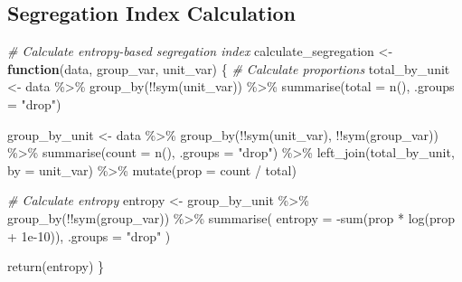 \documentclass[
]{article}
\newenvironment{Shaded}{\begin{snugshade}}{\end{snugshade}}
\newcommand{\AttributeTok}[1]{\textcolor[rgb]{0.77,0.63,0.00}{#1}}
\newcommand{\CommentTok}[1]{\textcolor[rgb]{0.56,0.35,0.01}{\textit{#1}}}
\newcommand{\ControlFlowTok}[1]{\textcolor[rgb]{0.13,0.29,0.53}{\textbf{#1}}}
\newcommand{\FloatTok}[1]{\textcolor[rgb]{0.00,0.00,0.81}{#1}}
\newcommand{\FunctionTok}[1]{\textcolor[rgb]{0.00,0.00,0.00}{#1}}
\newcommand{\NormalTok}[1]{#1}
\newcommand{\OtherTok}[1]{\textcolor[rgb]{0.56,0.35,0.01}{#1}}
\newcommand{\SpecialCharTok}[1]{\textcolor[rgb]{0.00,0.00,0.00}{#1}}
\newcommand{\StringTok}[1]{\textcolor[rgb]{0.31,0.60,0.02}{#1}}
\begin{document}
\hypertarget{segregation-index-calculation}{%
\subsection{Segregation Index
Calculation}\label{segregation-index-calculation}}

\begin{Shaded}
\begin{Highlighting}[]
\CommentTok{\# Calculate entropy{-}based segregation index}
\NormalTok{calculate\_segregation }\OtherTok{\textless{}{-}} \ControlFlowTok{function}\NormalTok{(data, group\_var, unit\_var) \{}
  \CommentTok{\# Calculate proportions}
\NormalTok{  total\_by\_unit }\OtherTok{\textless{}{-}}\NormalTok{ data }\SpecialCharTok{\%\textgreater{}\%}
    \FunctionTok{group\_by}\NormalTok{(}\SpecialCharTok{!!}\FunctionTok{sym}\NormalTok{(unit\_var)) }\SpecialCharTok{\%\textgreater{}\%}
    \FunctionTok{summarise}\NormalTok{(}\AttributeTok{total =} \FunctionTok{n}\NormalTok{(), }\AttributeTok{.groups =} \StringTok{"drop"}\NormalTok{)}
  
\NormalTok{  group\_by\_unit }\OtherTok{\textless{}{-}}\NormalTok{ data }\SpecialCharTok{\%\textgreater{}\%}
    \FunctionTok{group\_by}\NormalTok{(}\SpecialCharTok{!!}\FunctionTok{sym}\NormalTok{(unit\_var), }\SpecialCharTok{!!}\FunctionTok{sym}\NormalTok{(group\_var)) }\SpecialCharTok{\%\textgreater{}\%}
    \FunctionTok{summarise}\NormalTok{(}\AttributeTok{count =} \FunctionTok{n}\NormalTok{(), }\AttributeTok{.groups =} \StringTok{"drop"}\NormalTok{) }\SpecialCharTok{\%\textgreater{}\%}
    \FunctionTok{left\_join}\NormalTok{(total\_by\_unit, }\AttributeTok{by =}\NormalTok{ unit\_var) }\SpecialCharTok{\%\textgreater{}\%}
    \FunctionTok{mutate}\NormalTok{(}\AttributeTok{prop =}\NormalTok{ count }\SpecialCharTok{/}\NormalTok{ total)}
  
  \CommentTok{\# Calculate entropy}
\NormalTok{  entropy }\OtherTok{\textless{}{-}}\NormalTok{ group\_by\_unit }\SpecialCharTok{\%\textgreater{}\%}
    \FunctionTok{group\_by}\NormalTok{(}\SpecialCharTok{!!}\FunctionTok{sym}\NormalTok{(group\_var)) }\SpecialCharTok{\%\textgreater{}\%}
    \FunctionTok{summarise}\NormalTok{(}
      \AttributeTok{entropy =} \SpecialCharTok{{-}}\FunctionTok{sum}\NormalTok{(prop }\SpecialCharTok{*} \FunctionTok{log}\NormalTok{(prop }\SpecialCharTok{+} \FloatTok{1e{-}10}\NormalTok{)),}
      \AttributeTok{.groups =} \StringTok{"drop"}
\NormalTok{    )}
  
  \FunctionTok{return}\NormalTok{(entropy)}
\NormalTok{\}}


\end{Highlighting}
\end{Shaded}
\end{document}
